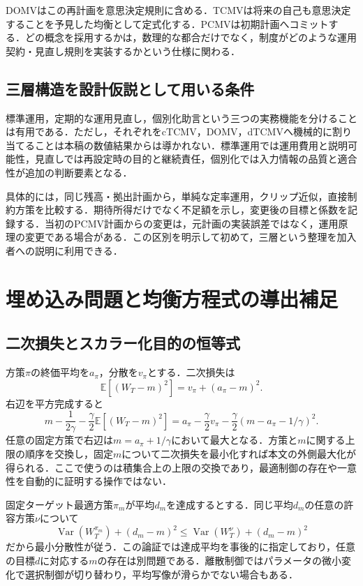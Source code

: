 \documentclass[11pt,a4paper]{article}
\numberwithin{equation}{section}
\numberwithin{table}{section}
\numberwithin{figure}{section}
\theoremstyle{plain}
\theoremstyle{definition}
\newcommand{\E}{\mathbb{E}}
\DeclareMathOperator{\Var}{Var}
\begin{document}
DOMVはこの再計画を意思決定規則に含める．TCMVは将来の自己も意思決定することを予見した均衡として定式化する．PCMVは初期計画へコミットする．どの概念を採用するかは，数理的な都合だけでなく，制度がどのような運用契約・見直し規則を実装するかという仕様に関わる．

\subsection{三層構造を設計仮説として用いる条件}
標準運用，定期的な運用見直し，個別化助言という三つの実務機能を分けることは有用である．ただし，それぞれをcTCMV，DOMV，dTCMVへ機械的に割り当てることは本稿の数値結果からは導かれない．標準運用では運用費用と説明可能性，見直しでは再設定時の目的と継続責任，個別化では入力情報の品質と適合性が追加の判断要素となる．

具体的には，同じ残高・拠出計画から，単純な定率運用，クリップ近似，直接制約方策を比較する．期待所得だけでなく不足額を示し，変更後の目標と係数を記録する．当初のPCMV計画からの変更は，元計画の実装誤差ではなく，運用原理の変更である場合がある．この区別を明示して初めて，三層という整理を加入者への説明に利用できる．

\FloatBarrier
\section{埋め込み問題と均衡方程式の導出補足}
\label{app:derivations}
\subsection{二次損失とスカラー化目的の恒等式}
方策$\pi$の終価平均を$a_\pi$，分散を$v_\pi$とする．二次損失は
\begin{equation}
\E[(W_T-m)^2]=v_\pi+(a_\pi-m)^2.
\end{equation}
右辺を平方完成すると
\begin{equation}
m-\frac1{2\gamma}-\frac\gamma2\E[(W_T-m)^2]
=a_\pi-\frac\gamma2v_\pi-\frac\gamma2(m-a_\pi-1/\gamma)^2.
\end{equation}
任意の固定方策で右辺は$m=a_\pi+1/\gamma$において最大となる．方策と$m$に関する上限の順序を交換し，固定$m$について二次損失を最小化すれば本文の外側最大化が得られる．ここで使うのは積集合上の上限の交換であり，最適制御の存在や一意性を自動的に証明する操作ではない．

固定ターゲット最適方策$\pi_m$が平均$d_m$を達成するとする．同じ平均$d_m$の任意の許容方策$\nu$について
\begin{equation}
\Var(W_T^{\pi_m})+(d_m-m)^2
\leq\Var(W_T^\nu)+(d_m-m)^2
\end{equation}
だから最小分散性が従う．この論証では達成平均を事後的に指定しており，任意の目標$d$に対応する$m$の存在は別問題である．離散制御ではパラメータの微小変化で選択制御が切り替わり，平均写像が滑らかでない場合もある．
\end{document}
